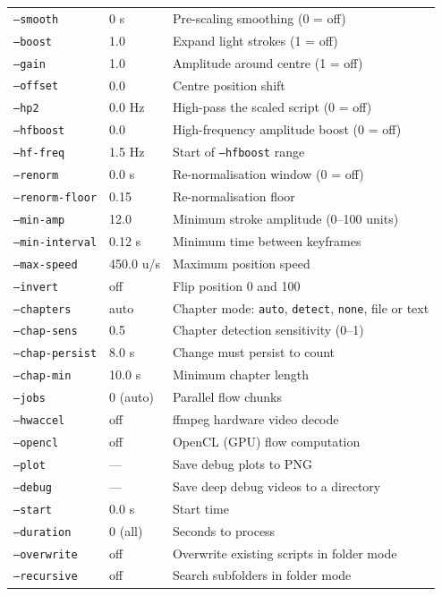 \documentclass[11pt,a4paper]{article}
\newcommand{\code}[1]{\texttt{#1}}
\begin{document}
\begin{center}
\begin{tabular}{llp{6.5cm}}
  \code{--smooth}        & 0 s         & Pre-scaling smoothing (0 = off) \\
  \code{--boost}         & 1.0         & Expand light strokes (1 = off) \\
  \code{--gain}          & 1.0         & Amplitude around centre (1 = off) \\
  \code{--offset}        & 0.0         & Centre position shift \\
  \code{--hp2}           & 0.0 Hz      & High-pass the scaled script (0 = off) \\
  \code{--hfboost}       & 0.0         & High-frequency amplitude boost (0 = off) \\
  \code{--hf-freq}       & 1.5 Hz      & Start of \code{--hfboost} range \\
  \code{--renorm}        & 0.0 s       & Re-normalisation window (0 = off) \\
  \code{--renorm-floor}  & 0.15        & Re-normalisation floor \\
  \code{--min-amp}       & 12.0        & Minimum stroke amplitude (0--100 units) \\
  \code{--min-interval}  & 0.12 s      & Minimum time between keyframes \\
  \code{--max-speed}     & 450.0 u/s   & Maximum position speed \\
  \code{--invert}        & off         & Flip position 0 and 100 \\
  \code{--chapters}      & auto        & Chapter mode: \code{auto}, \code{detect}, \code{none}, file or text \\
  \code{--chap-sens}     & 0.5         & Chapter detection sensitivity (0--1) \\
  \code{--chap-persist}  & 8.0 s       & Change must persist to count \\
  \code{--chap-min}      & 10.0 s      & Minimum chapter length \\
  \code{--jobs}          & 0 (auto)    & Parallel flow chunks \\
  \code{--hwaccel}       & off         & ffmpeg hardware video decode \\
  \code{--opencl}        & off         & OpenCL (GPU) flow computation \\
  \code{--plot}          & ---         & Save debug plots to PNG \\
  \code{--debug}         & ---         & Save deep debug videos to a directory \\
  \code{--start}         & 0.0 s       & Start time \\
  \code{--duration}      & 0 (all)     & Seconds to process \\
  \code{--overwrite}     & off         & Overwrite existing scripts in folder mode \\
  \code{--recursive}     & off         & Search subfolders in folder mode \\
  \bottomrule
\end{tabular}
\end{center}
\end{document}
